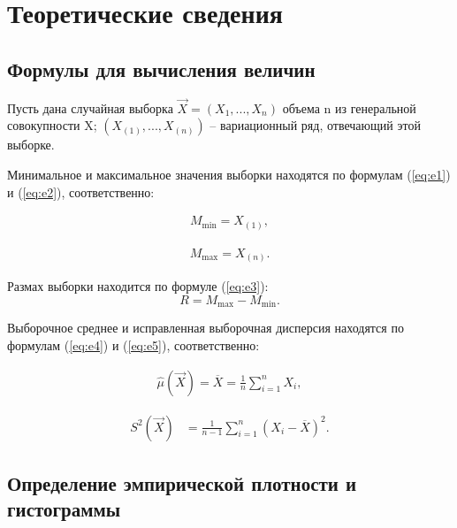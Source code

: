 \chapter{Теоретические сведения}

\section{Формулы для вычисления величин}

Пусть дана случайная выборка $\vec X = (X_1, ..., X_n)$ объема n из генеральной совокупности X;  $(X_{(1)}, ..., X_{(n)})$ -- вариационный ряд, отвечающий этой выборке.

Минимальное и максимальное значения выборки находятся по формулам (\ref {eq:e1}) и (\ref {eq:e2}), соответственно:

\begin{equation}
    \begin{aligned}
        M_{\min} = X_{(1)},
    \end{aligned}
	\label{eq:e1}
\end{equation}

\begin{equation}
	\begin{aligned}
		M_{\max} = X_{(n)}.
	\end{aligned}
	\label{eq:e2}
\end{equation}

Размах выборки находится по формуле (\ref {eq:e3}):
\begin{equation}
    R = M_{\max} - M_{\min}.
    \label{eq:e3}
\end{equation}


Выборочное среднее и исправленная выборочная дисперсия находятся по формулам (\ref {eq:e4}) и (\ref {eq:e5}), соответственно:

\begin{equation}
	\begin{aligned}
		\hat\mu(\vec X) = \overline X = \frac 1n \sum_{i=1}^n X_i,
	\end{aligned}
	\label{eq:e4}
\end{equation}

\begin{equation}
	\begin{aligned}
		S^2(\vec X) &= \frac 1{n-1} \sum_{i=1}^n (X_i-\overline X)^2.
	\end{aligned}
	\label{eq:e5}
\end{equation}


\section{Определение эмпирической плотности и гистограммы}

